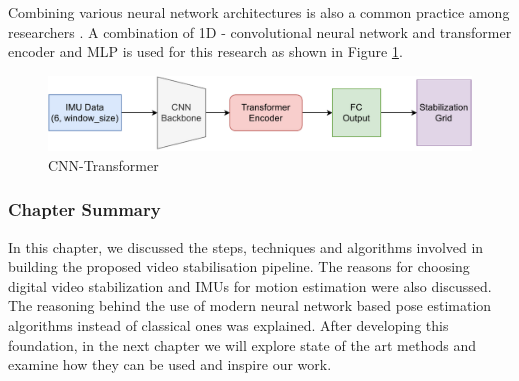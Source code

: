 Combining various neural network architectures is also a common practice among researchers \citep{deep_opti_stab} \citep{rao2022ctin}. A combination of 1D - convolutional neural network and transformer encoder and MLP is used for this research as shown in Figure \ref{fig:transformer_cnn}.

\begin{figure}[H]
    \centering
    \includegraphics[scale=0.7]{images/fig_chapter2/nns/transformer_cnn.pdf}
    \caption{CNN-Transformer}
    \label{fig:transformer_cnn}
\end{figure}

\subsubsection{Chapter Summary}
In this chapter, we discussed the steps, techniques and algorithms involved in building the proposed video stabilisation pipeline. The reasons for choosing digital video stabilization and IMUs for motion estimation were also discussed. The reasoning behind the use of modern neural network based pose estimation algorithms instead of classical ones was explained. After developing this foundation, in the next chapter we will explore state of the art methods and examine how they can be used and inspire our work.

